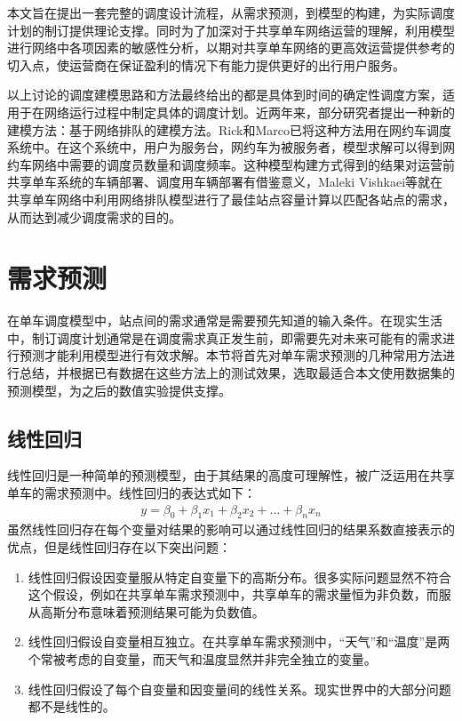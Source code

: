 \documentclass[]{tongjithesis}
\numberwithin{equation}{chapter}
\begin{document}
本文旨在提出一套完整的调度设计流程，从需求预测，到模型的构建，为实际调度计划的制订提供理论支撑。同时为了加深对于共享单车网络运营的理解，利用模型进行网络中各项因素的敏感性分析，以期对共享单车网络的更高效运营提供参考的切入点，使运营商在保证盈利的情况下有能力提供更好的出行用户服务。

以上讨论的调度建模思路和方法最终给出的都是具体到时间的确定性调度方案，适用于在网络运行过程中制定具体的调度计划。近两年来，部分研究者提出一种新的建模方法：基于网络排队的建模方法。Rick和Marco已将这种方法用在网约车调度系统中\cite{zhang2015queueing}。在这个系统中，用户为服务台，网约车为被服务者，模型求解可以得到网约车网络中需要的调度员数量和调度频率。这种模型构建方式得到的结果对运营前共享单车系统的车辆部署、调度用车辆部署有借鉴意义，Maleki Vishkaei等就在共享单车网络中利用网络排队模型进行了最佳站点容量计算以匹配各站点的需求，从而达到减少调度需求的目的\cite{vishkaei2020balancing}。

\clearpage

\chapter{需求预测}
在单车调度模型中，站点间的需求通常是需要预先知道的输入条件。在现实生活中，制订调度计划通常是在调度需求真正发生前，即需要先对未来可能有的需求进行预测才能利用模型进行有效求解。本节将首先对单车需求预测的几种常用方法进行总结，并根据已有数据在这些方法上的测试效果，选取最适合本文使用数据集的预测模型，为之后的数值实验提供支撑。
\section{线性回归}
线性回归是一种简单的预测模型，由于其结果的高度可理解性，被广泛运用在共享单车的需求预测中。线性回归的表达式如下：
\begin{align}
	y = \beta_{0}+\beta_{1}x_{1}+\beta_{2}x_{2}+...+\beta_{n}x_{n}
\end{align}
\noindent
虽然线性回归存在每个变量对结果的影响可以通过线性回归的结果系数直接表示的优点，但是线性回归存在以下突出问题：
\begin{enumerate}
	\item 线性回归假设因变量服从特定自变量下的高斯分布。很多实际问题显然不符合这个假设，例如在共享单车需求预测中，共享单车的需求量恒为非负数，而服从高斯分布意味着预测结果可能为负数值。
	\item 线性回归假设自变量相互独立。在共享单车需求预测中，“天气”和“温度”是两个常被考虑的自变量，而天气和温度显然并非完全独立的变量。
	\item 线性回归假设了每个自变量和因变量间的线性关系。现实世界中的大部分问题都不是线性的。
\end{enumerate}
\end{document}

